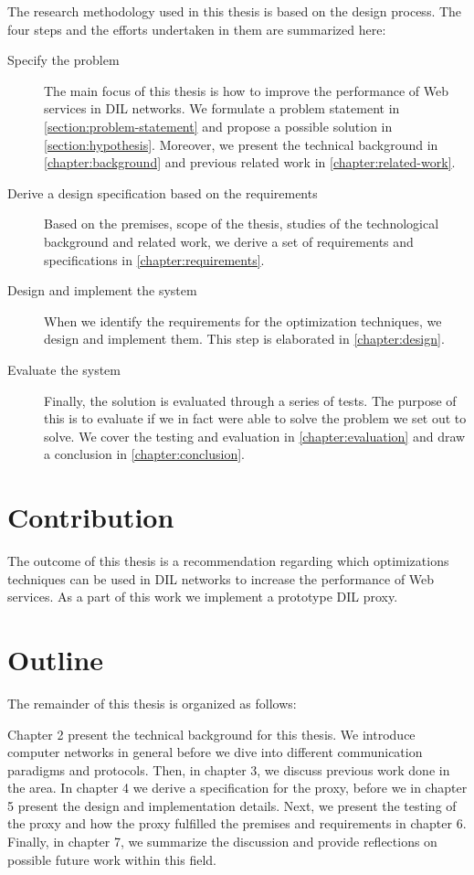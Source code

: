 The research methodology used in this thesis is based on the design process. The
four steps and the efforts undertaken in them are summarized here:

\begin{description}

    \item[Specify the problem] The main focus of this thesis is how to improve
    the performance of Web services in DIL networks. We formulate a problem
    statement in \cref{section:problem-statement} and propose a possible
    solution in \cref{section:hypothesis}. Moreover, we present the technical
    background in \cref{chapter:background} and previous related work in
    \cref{chapter:related-work}.

    \item[Derive a design specification based on the requirements] Based on the
    premises, scope of the thesis, studies of the technological background and
    related work, we derive a set of requirements and specifications in
    \cref{chapter:requirements}.

    \item[Design and implement the system] When we identify the requirements for
    the optimization techniques, we design and implement them. This step is
    elaborated in \cref{chapter:design}.

    \item[Evaluate the system] Finally, the solution is evaluated through a
    series of tests. The purpose of this is to evaluate if we in fact were able
    to solve the problem we set out to solve. We cover the testing and
    evaluation in \cref{chapter:evaluation} and draw a conclusion in
    \cref{chapter:conclusion}.

\end{description}


\section{Contribution}

The outcome of this thesis is a recommendation regarding which optimizations
techniques can be used in DIL networks to increase the performance of Web
services. As a part of this work we implement a prototype DIL proxy.

\section{Outline}

The remainder of this thesis is organized as follows:

Chapter 2 present the technical background for this thesis. We introduce
computer networks in general before we dive into different communication
paradigms and protocols. Then, in chapter 3, we discuss previous work done in
the area. In chapter 4 we derive a specification for the proxy, before we in
chapter 5 present the design and implementation details. Next, we present the
testing of the proxy and how the proxy fulfilled the premises and requirements
in chapter 6. Finally, in chapter 7, we summarize the discussion and provide
reflections on possible future work within this field.
